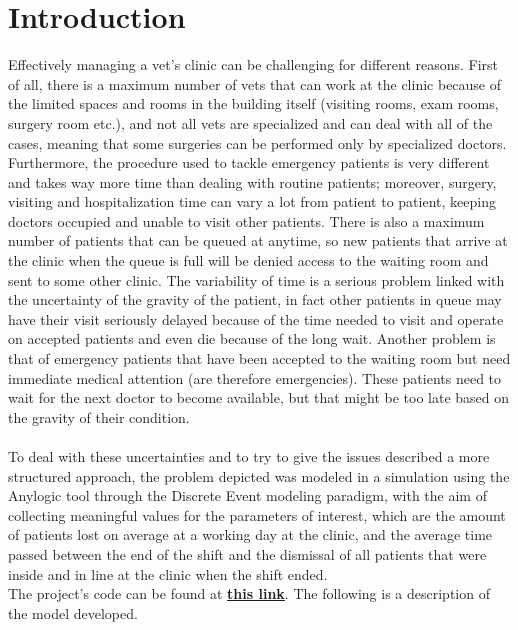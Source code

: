\documentclass[review]{article}
\begin{document}

\newpage{}
\tableofcontents
\newpage{}

\section{Introduction}
Effectively managing a vet's clinic can be challenging for different reasons. First of all, there is a maximum number of vets that can work at the clinic because of the limited spaces and rooms in the building itself (visiting rooms, exam rooms, surgery room etc.), and not all vets are specialized and can deal with all of the cases, meaning that some surgeries can be performed only by specialized doctors. Furthermore, the procedure used to tackle emergency patients is very different and takes way more time than dealing with routine patients; moreover, surgery, visiting and hospitalization time can vary a lot from patient to patient, keeping doctors occupied and unable to visit other patients. There is also a maximum number of patients that can be queued at anytime, so new patients that arrive at the clinic when the queue is full will be denied access to the waiting room and sent to some other clinic. The variability of time is a serious problem linked with the uncertainty of the gravity of the patient, in fact other patients in queue may have their visit seriously delayed because of the time needed to visit and operate on accepted patients and even die because of the long wait. Another problem is that of emergency patients that have been accepted to the waiting room but need immediate medical attention (are therefore emergencies). These patients need to wait for the next doctor to become available, but that might be too late based on the gravity of their condition.
\\\\
To deal with these uncertainties and to try to give the issues described a more structured approach, the problem depicted was modeled in a simulation using the Anylogic tool through the Discrete Event modeling paradigm, with the aim of collecting meaningful values for the parameters of interest, which are the amount of patients lost on average at a working day at the clinic, and the average time passed between the end of the shift and the dismissal of all patients that were inside and in line at the clinic when the shift ended.\\The project's code can be found at \href{https://github.com/sarareg0412/Vet-s-Clinic}{\textbf{this link}}. The following is a description of the model developed.
\end{document}
